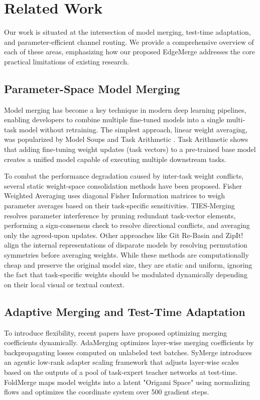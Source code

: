 \section{Related Work}
\label{sec:related_work}

Our work is situated at the intersection of model merging, test-time adaptation, and parameter-efficient channel routing. We provide a comprehensive overview of each of these areas, emphasizing how our proposed EdgeMerge addresses the core practical limitations of existing research.

\subsection{Parameter-Space Model Merging}
Model merging has become a key technique in modern deep learning pipelines, enabling developers to combine multiple fine-tuned models into a single multi-task model without retraining. The simplest approach, linear weight averaging, was popularized by Model Soups \cite{wortsman2022model} and Task Arithmetic \cite{ilharco2023editing}. Task Arithmetic shows that adding fine-tuning weight updates (task vectors) to a pre-trained base model creates a unified model capable of executing multiple downstream tasks.

To combat the performance degradation caused by inter-task weight conflicts, several static weight-space consolidation methods have been proposed. Fisher Weighted Averaging \cite{matena2022merging} uses diagonal Fisher Information matrices to weigh parameter averages based on their task-specific sensitivities. TIES-Merging \cite{yadav2023resolving} resolves parameter interference by pruning redundant task-vector elements, performing a sign-consensus check to resolve directional conflicts, and averaging only the agreed-upon updates. Other approaches like Git Re-Basin \cite{ainsworth2023git} and ZipIt! \cite{stoica2023zipit} align the internal representations of disparate models by resolving permutation symmetries before averaging weights. While these methods are computationally cheap and preserve the original model size, they are static and uniform, ignoring the fact that task-specific weights should be modulated dynamically depending on their local visual or textual context.

\subsection{Adaptive Merging and Test-Time Adaptation}
To introduce flexibility, recent papers have proposed optimizing merging coefficients dynamically. AdaMerging \cite{yu2024adamerging} optimizes layer-wise merging coefficients by backpropagating losses computed on unlabeled test batches. SyMerge \cite{lu2026symerge} introduces an agentic low-rank adapter scaling framework that adjusts layer-wise scales based on the outputs of a pool of task-expert teacher networks at test-time. FoldMerge maps model weights into a latent "Origami Space" using normalizing flows and optimizes the coordinate system over 500 gradient steps.


